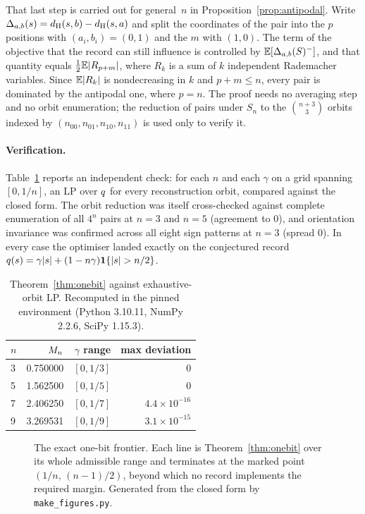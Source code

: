 That last step is carried out for general~$n$ in
Proposition~\ref{prop:antipodal}. Write $\Delta_{a,b}(s) = d_{\mathrm{H}}(s,b) - d_{\mathrm{H}}(s,a)$
and split the coordinates of the pair into the $p$ positions with
$(a_i,b_i) = (0,1)$ and the $m$ with $(1,0)$. The term of the objective that the
record can still influence is controlled by $\mathbb{E}[\Delta_{a,b}(S)^-]$, and that
quantity equals $\tfrac12 \mathbb{E}|R_{p+m}|$, where $R_k$ is a sum of $k$ independent
Rademacher variables. Since $\mathbb{E}|R_k|$ is nondecreasing in $k$ and $p + m \le n$,
every pair is dominated by the antipodal one, where $p = n$. The proof needs no
averaging step and no orbit enumeration; the reduction of pairs under $S_n$ to
the $\binom{n+3}{3}$ orbits indexed by $(n_{00},n_{01},n_{10},n_{11})$ is used
only to verify it.

\paragraph{Verification.}
Table~\ref{tab:onebit} reports an independent check: for each $n$ and each
$\gamma$ on a grid spanning $[0, 1/n]$, an LP over $q$ for every
reconstruction orbit, compared against the closed form. The orbit reduction was
itself cross-checked against complete enumeration of all $4^n$ pairs at $n = 3$
and $n = 5$ (agreement to $0$), and orientation invariance was confirmed across
all eight sign patterns at $n = 3$ (spread $0$). In every case the optimiser
landed exactly on the conjectured record
$q(s) = \gamma|s| + (1-n\gamma)\mathbf{1}\{|s| > n/2\}$.

\begin{table}[t]
\centering
\caption{Theorem~\ref{thm:onebit} against exhaustive-orbit LP.
Recomputed in the pinned environment (Python 3.10.11, NumPy 2.2.6,
SciPy 1.15.3).}
\label{tab:onebit}
\begin{tabular}{@{}lrrr@{}}
\toprule
$n$ & $M_n$ & $\gamma$ range & max deviation \\
\midrule
3 & 0.750000 & $[0, 1/3]$ & $0$ \\
5 & 1.562500 & $[0, 1/5]$ & $0$ \\
7 & 2.406250 & $[0, 1/7]$ & $4.4\times10^{-16}$ \\
9 & 3.269531 & $[0, 1/9]$ & $3.1\times10^{-15}$ \\
\bottomrule
\end{tabular}
\end{table}

\begin{figure}[t]
\centering

\caption{The exact one-bit frontier. Each line is
Theorem~\ref{thm:onebit} over its whole admissible range and terminates at the
marked point $(1/n,\,(n-1)/2)$, beyond which no record implements the required
margin. Generated from the closed form by \texttt{make\_figures.py}.}
\label{fig:frontier}
\end{figure}

